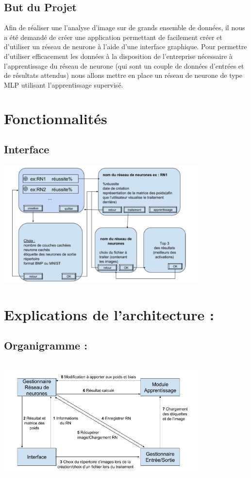 \documentclass{article}
\begin{document}
	\subsection{But du Projet}
		Afin de réaliser une l'analyse d'image sur de grands ensemble de données, il nous a été demandé de créer une application permettant de facilement créer et d'utiliser un réseau de neurone à l'aide d'une interface graphique. Pour permettre d'utiliser efficacement les données à la disposition de l'entreprise nécessaire à l'apprentissage du réseau de neurone (qui sont un couple de données d'entrées et de résultats attendus) nous allons mettre en place un réseau de neurone de type MLP utilisant l'apprentissage supervisé.

\section{Fonctionnalités}
\subsection{Interface}
			\begin{center} 
				\includegraphics[height=244, width=400]{croquis.PNG}
			\end{center}

\section{Explications de l'architecture :}
\subsection{Organigramme :}
			\begin{center} 
				\includegraphics[height=244, width=400]{liens.PNG}
			\end{center}
\end{document}
